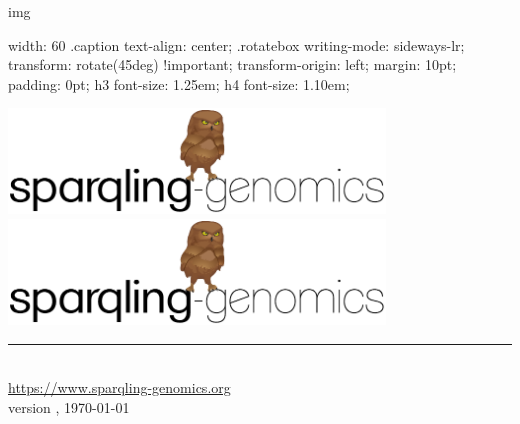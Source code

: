 \documentclass[11pt,a4paper,oneside]{book}
\begin{document}
img { width: 60%
.caption { text-align: center; }
.rotatebox {
  writing-mode: sideways-lr;
  transform: rotate(45deg) !important;
  transform-origin: left;
  margin: 10pt;
  padding: 0pt;
}
h3 { font-size: 1.25em; }
h4 { font-size: 1.10em; }
\EndCssFile
\fi

\begin{titlepage}
  \vspace*{\fill}
  \begin{center}
    \ifdefined\HCode
    \includegraphics[width=0.75\textwidth]{figures/logo.pdf}~\\
    \else
    \includegraphics[width=0.75\textwidth]{figures/logo.pdf}
    \fi
    \rule{0.75\textwidth}{1.0pt}~\\
    \url{https://www.sparqling-genomics.org}~\\
    \large version \sgversion{}, \today{}
    \ifdefined\HCode
    \else
    ~\\~\\~\\~\\~\\~\\~\\~\\~\\~\\~\\~\\~\\~\\
    \fi
  \end{center}
  \vspace*{\fill}

  \thispagestyle{empty}
\end{titlepage}

}
\end{document}

